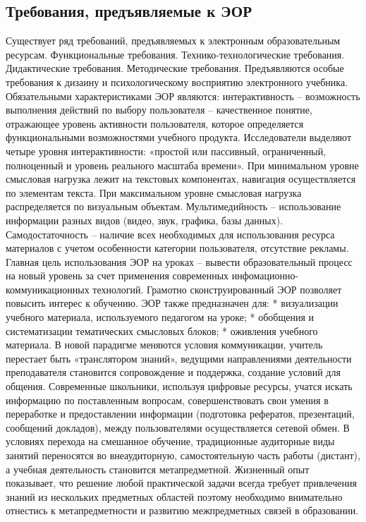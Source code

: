 \large
\subsection{Требования, предъявляемые к ЭОР}

Существует ряд требований, предъявляемых к электронным образовательным ресурсам.
Функциональные требования. Технико-технологические требования. Дидактические требования. Методические требования. Предъявляются особые требования к дизаину и психологическому восприятию электронного учебника.
Обязательными характеристиками ЭОР являются: интерактивность – возможность выполнения действий по выбору пользователя – качественное понятие, отражающее уровень активности пользователя, которое определяется функциональными возможностями учебного продукта.
Исследователи выделяют четыре уровня интерактивности: «простой или пассивный, ограниченный, полноценный и уровень реального масштаба времени»\cite{3}.
При минимальном уровне смысловая нагрузка лежит на текстовых компонентах, навигация осуществляется по элементам текста.
При максимальном уровне смысловая нагрузка распределяется по визуальным объектам.
Мультимедийность – использование информации разных видов (видео, звук, графика, базы данных).
Самодостаточность – наличие всех необходимых для использования ресурса материалов с учетом особенности категории пользователя, отсутствие рекламы.
Главная цель использования ЭОР на уроках – вывести образовательный процесс на новый уровень за счет применения современных инфомационно-коммуникационных технологий.
Грамотно сконструированный ЭОР позволяет повысить интерес к обучению.
ЭОР также предназначен для:
* визуализации учебного материала, используемого педагогом на уроке;
* обобщения и систематизации тематических смысловых блоков;
* оживления учебного материала.
В новой парадигме меняются условия коммуникации, учитель перестает быть «транслятором знаний», ведущими направлениями деятельности преподавателя становится сопровождение и поддержка, создание условий для общения.
Современные школьники, используя цифровые ресурсы, учатся искать информацию по поставленным вопросам, совершенствовать свои умения в переработке и предоставлении информации (подготовка рефератов, презентаций, сообщений докладов), между пользователями осуществляется сетевой обмен\cite{4}.
В условиях перехода на смешанное обучение, традиционные аудиторные виды занятий переносятся во внеаудиторную, самостоятельную часть работы (дистант), а учебная деятельность становится метапредметной.
Жизненный опыт показывает, что решение любой практической задачи всегда требует привлечения знаний из нескольких предметных областей поэтому необходимо внимательно отнестись к метапредметности и развитию межпредметных связей в образовании\cite{5}.
